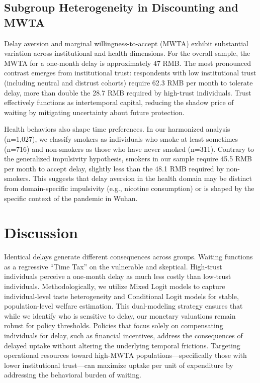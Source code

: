 \documentclass[preprint,12pt,authoryear]{elsarticle}
\begin{document}
\subsection{Subgroup Heterogeneity in Discounting and MWTA}
Delay aversion and marginal willingness-to-accept (MWTA) exhibit substantial variation across institutional and health dimensions. 
For the overall sample, the MWTA for a one-month delay is approximately 47 RMB. 
The most pronounced contrast emerges from institutional trust: respondents with low institutional trust (including neutral and distrust cohorts) require 62.3 RMB per month to tolerate delay, more than double the 28.7 RMB required by high-trust individuals. Trust effectively functions as intertemporal capital, reducing the shadow price of waiting by mitigating uncertainty about future protection.

Health behaviors also shape time preferences. In our harmonized analysis (n=1,027), we classify smokers as individuals who smoke at least sometimes (n=716) and non-smokers as those who have never smoked (n=311). Contrary to the generalized impulsivity hypothesis, smokers in our sample require 45.5 RMB per month to accept delay, slightly less than the 48.1 RMB required by non-smokers. This suggests that delay aversion in the health domain may be distinct from domain-specific impulsivity (e.g., nicotine consumption) or is shaped by the specific context of the pandemic in Wuhan. 

\section{Discussion}
Identical delays generate different consequences across groups. Waiting functions as a regressive ``Time Tax'' on the vulnerable and skeptical. High-trust individuals perceive a one-month delay as much less costly than low-trust individuals. 
Methodologically, we utilize Mixed Logit models to capture individual-level taste heterogeneity and Conditional Logit models for stable, population-level welfare estimation. This dual-modeling strategy ensures that while we identify who is sensitive to delay, our monetary valuations remain robust for policy thresholds. 
Policies that focus solely on compensating individuals for delay, such as financial incentives, address the consequences of delayed uptake without altering the underlying temporal frictions. Targeting operational resources toward high-MWTA populations—specifically those with lower institutional trust—can maximize uptake per unit of expenditure by addressing the behavioral burden of waiting.
\end{document}
